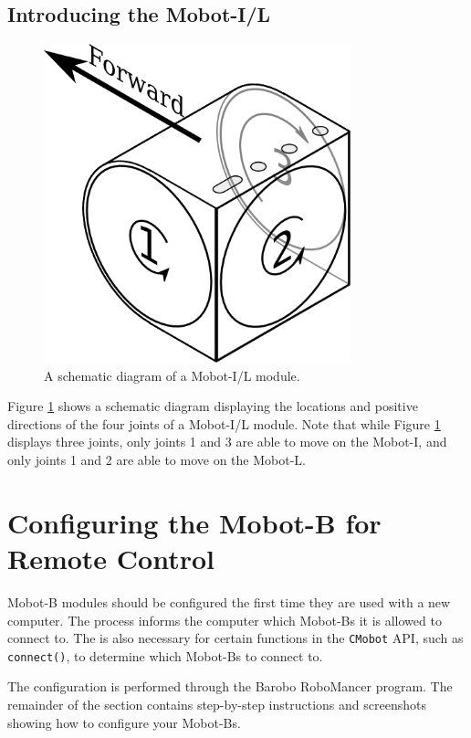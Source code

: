 \documentclass{article}
\begin{document}
\subsection{Introducing the Mobot-I/L}
\begin{figure}[H]
\begin{center}
\includegraphics[width=3.5in]{images/DOF_joint_diagram.png}
\end{center}
\caption{\label{fig:joint_diagram_il} A schematic diagram of a Mobot-I/L module.}
\end{figure}

Figure \ref{fig:joint_diagram_il} shows a schematic diagram displaying the
locations and positive directions of the four joints of a Mobot-I/L module. 
Note that while Figure \ref{fig:joint_diagram_il} displays three joints,
only joints 1 and 3 are able to move on the Mobot-I, and only joints 1 and 2 are
able to move on the Mobot-L.

\section{\label{sec:pairing}Configuring the Mobot-B for Remote Control}
Mobot-B modules should be configured the first time they are used with 
a new computer. The process informs the computer which Mobot-Bs it
is allowed to connect to. The is also necessary for certain 
functions in the \texttt{CMobot} API, such as \texttt{connect()},
to determine which Mobot-Bs to connect to.

The configuration is performed through the Barobo RoboMancer
program. The remainder of the section contains step-by-step instructions
and screenshots showing how to configure your Mobot-Bs.
\end{document}
